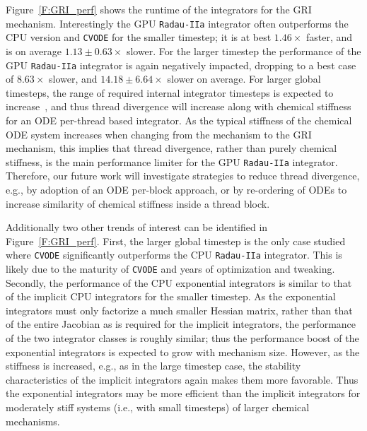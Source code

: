 \documentclass[preprint]{elsarticle}
\begin{document}
Figure~\ref{F:GRI_perf} shows the runtime of the integrators for the GRI mechanism.
Interestingly the GPU \texttt{Radau-IIa} integrator often outperforms the CPU version and \texttt{CVODE} for the smaller timestep; it is at best $1.46\times$ faster, and is on average $1.13\pm0.63\times$ slower.
For the larger timestep the performance of the GPU \texttt{Radau-IIa} integrator is again negatively impacted, dropping to a best case of $8.63\times$ slower, and $14.18\pm6.64\times$ slower on average.
For larger global timesteps, the range of required internal integrator timesteps is expected to increase~\cite{Niemeyer:2014aa}, and thus thread divergence will increase along with chemical stiffness for an ODE per-thread based integrator.
As the typical stiffness of the chemical ODE system increases when changing from the  mechanism to the GRI mechanism, this implies that thread divergence, rather than purely chemical stiffness, is the main performance limiter for the GPU \texttt{Radau-IIa} integrator.
Therefore, our future work will investigate strategies to reduce thread divergence, e.g., by adoption of an ODE per-block approach, or by re-ordering of ODEs to increase similarity of chemical stiffness inside a thread block.

Additionally two other trends of interest can be identified in Figure~\ref{F:GRI_perf}.
First, the larger global timestep is the only case studied where \texttt{CVODE} significantly outperforms the CPU \texttt{Radau-IIa} integrator.
This is likely due to the maturity of \texttt{CVODE} and years of optimization and tweaking.
Secondly, the performance of the CPU exponential integrators is similar to that of the implicit CPU integrators for the smaller timestep.
As the exponential integrators must only factorize a much smaller Hessian matrix, rather than that of the entire Jacobian as is required for the implicit integrators, the performance of the two integrator classes is roughly similar; thus the performance boost of the exponential integrators is expected to grow with mechanism size.
However, as the stiffness is increased, e.g., as in the large timestep case, the stability characteristics of the implicit integrators again makes them more favorable.
Thus the exponential integrators may be more efficient than the implicit integrators for moderately stiff systems (i.e., with small timesteps) of larger chemical mechanisms.
\end{document}
